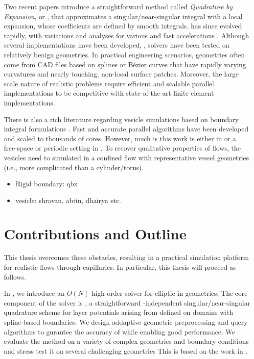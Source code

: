 Two recent papers \cite{barnett2014evaluation,KBGO} introduce a straightforward method called \textit{Quadrature by Expansion}, or \qbx, that approximates a singular/near-singular integral with a local expansion, whose coefficients are defined by smooth integrals.
\qbx has since evolved rapidly, with variations \cite{ST,aT1,RBZ,af2016fast} and analyses \cite{EGK,aT2,klinteberg2020quadrature} for various \pdes and fast accelerations \cite{RKO,wala20193d,wala2019optimization,wala2020approximation}.
Although several \threed implementations have been developed, \cite{ST, wala2019optimization,wala2020approximation, wala20193d}, \threed solvers have been tested on relatively benign geometries.
In practical engineering scenarios, geometries often come from CAD files based on splines or B\'ezier curves that have rapidly varying curvatures and nearly touching, non-local surface patches.
Moreover, the large scale nature of realistic problems require efficient and scalable parallel implementations to be competitive with state-of-the-art finite element implementations.

There is also a rich literature regarding vesicle simulations based on boundary integral formulations .
Fast and accurate parallel algorithms have been developed and scaled to thousands of cores. 
However, much is this work is either in \twod {} or a free-space or periodic setting in \threed.
To recover qualitative properties of \rbc flows, the vesicles need to simulated in a confined flow with representative vessel geometries (i.e., more complicated than a cylinder/torus).
\begin{itemize}
    \item Rigid boundary: qbx
    \item vesicle: shravan, abtin, dhairya etc.
\end{itemize}

\section{Contributions and Outline}
This thesis overcomes these obstacles, resulting in a practical simulation platform for realistic \rbc flows through capillaries.
In particular, this thesis will proceed as follows.

In , we introduce an $O(N)$ high-order solver for elliptic \pdes in \threed geometries.
The core component of the solver is \qbkix, a straightforward \pde-independent singular/near-singular quadrature scheme for layer potentials arising from \pdes defined on domains with spline-based boundaries.
We design addaptive geometric preprocessing and query algorithms to gurantee the accuracy of \qbkix while enabling good performance. 
We evaluate the method on a variety of complex geometries and boundary conditions and stress test it on several challenging geometries
This is based on the work in \cite{morse2020robust}.

